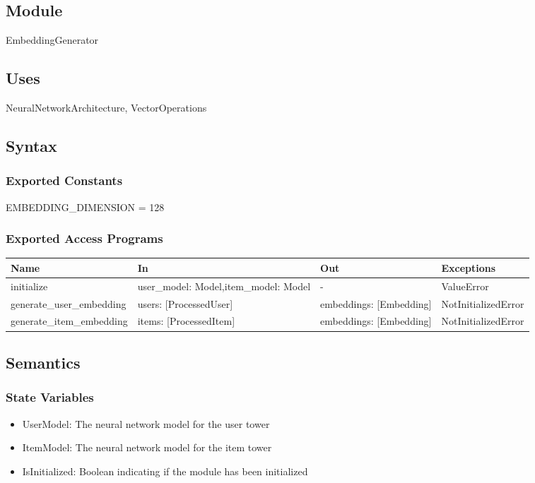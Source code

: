 \documentclass[12pt, titlepage]{article}
\begin{document}
\subsection{Module}

EmbeddingGenerator

\subsection{Uses}
NeuralNetworkArchitecture, VectorOperations

\subsection{Syntax}

\subsubsection{Exported Constants}
EMBEDDING\_DIMENSION = 128
\subsubsection{Exported Access Programs}

\begin{center}
\begin{tabular}{p{5cm} p{4cm} p{4cm} p{3cm}}
\hline
\textbf{Name} & \textbf{In} & \textbf{Out} & \textbf{Exceptions} \\
\hline
initialize & user\_model: Model,item\_model: Model & - & ValueError \\
\hline
generate\_user\_embedding & users: [ProcessedUser] & embeddings: [Embedding] & NotInitializedError\\
\hline
generate\_item\_embedding & items: [ProcessedItem] & embeddings: [Embedding] & NotInitializedError\\
\hline
\end{tabular}
\end{center}

\subsection{Semantics}

\subsubsection{State Variables}
\begin{itemize}
  \item UserModel: The neural network model for the user tower
  \item ItemModel: The neural network model for the item tower
  \item IsInitialized: Boolean indicating if the module has been initialized
\end{itemize}
\end{document}
